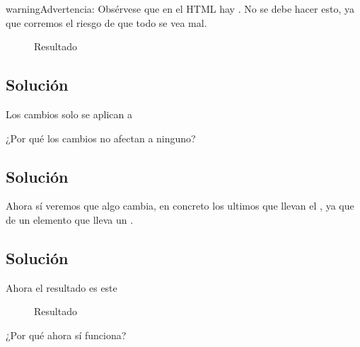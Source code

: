 \documentclass[letterpaper,10pt,spanish]{sphinxmanual}
\begin{document}
\begin{sphinxadmonition}{warning}{Advertencia:}
Obsérvese que en el HTML hay . No se debe hacer esto, ya que corremos el riesgo de que todo se vea mal.
\end{sphinxadmonition}

\begin{figure}[htbp]
\centering
\capstart

\noindent{}
\caption{Resultado}\label{\detokenize{tema3:id18}}\end{figure}


\subsection{Solución }
\label{\detokenize{tema3:solucion-p-destacado-li-elemento-enumeracion}}
Los cambios solo se aplican a 

¿Por qué los cambios no afectan a ninguno?


\subsection{Solución }
\label{\detokenize{tema3:solucion-p-destacado-elemento-numeracion}}
Ahora sí veremos que algo cambia, en concreto los ultimos  que llevan el , ya que  de un elemento que lleva un .


\subsection{Solución }
\label{\detokenize{tema3:solucion-destacado-id1}}
Ahora el resultado es este

\begin{figure}[htbp]
\centering
\capstart

\noindent{}
\caption{Resultado}\label{\detokenize{tema3:id19}}\end{figure}

¿Por qué ahora sí funciona?
\end{document}
